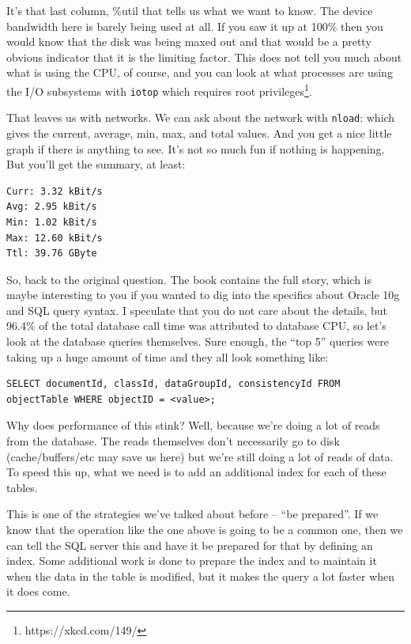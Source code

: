 \documentclass[a4paper]{report}
\begin{document}
It's that last column, \%util that tells us what we want to know. The device bandwidth here is barely being used at all. If you saw it up at 100\% then you would know that the disk was being maxed out and that would be a pretty obvious indicator that it is the limiting factor. This does not tell you much about what is using the CPU, of course, and you can look at what processes are using the I/O subsystems with \texttt{iotop} which requires root privileges\footnote{https://xkcd.com/149/}.

That leaves us with networks. We can ask about the network with \texttt{nload}: which gives the current, average, min, max, and total values. And you get a nice little graph if there is anything to see. It's not so much fun if nothing is happening. But you'll get the summary, at least:

\begin{verbatim}
Curr: 3.32 kBit/s
Avg: 2.95 kBit/s
Min: 1.02 kBit/s
Max: 12.60 kBit/s
Ttl: 39.76 GByte                                                                                       \end{verbatim}


So, back to the original question. The book contains the full story, which is maybe interesting to you if you wanted to dig into the specifics about Oracle 10g and SQL query syntax. I speculate that you do not care about the details, but 96.4\% of the total database call time was attributed to database CPU, so let's look at the database queries themselves. Sure enough, the ``top 5'' queries were taking up a huge amount of time and they all look something like:

\begin{verbatim}
SELECT documentId, classId, dataGroupId, consistencyId FROM objectTable WHERE objectID = <value>;
\end{verbatim}

Why does performance of this stink? Well, because we're doing a lot of reads from the database. The reads themselves don't necessarily go to disk (cache/buffers/etc may save us here) but we're still doing a lot of reads of data. To speed this up, what we need is to add an additional index for each of these tables. 

This is one of the strategies we've talked about before -- ``be prepared''. If we know that the operation like the one above is going to be a common one, then we can tell the SQL server this and have it be prepared for that by defining an index. Some additional work is done to prepare the index and to maintain it when the data in the table is modified, but it makes the query a lot faster when it does come. 
\end{document}
